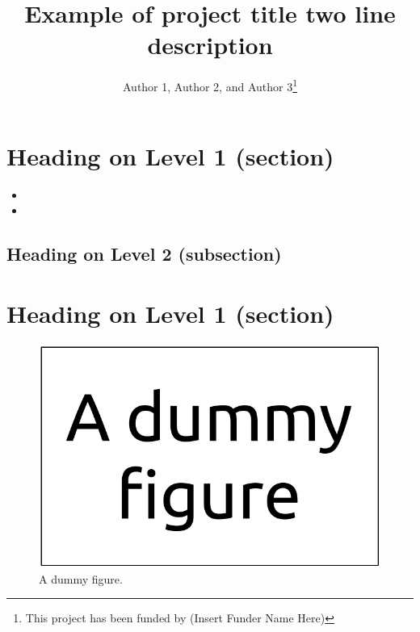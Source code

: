 \documentclass{insightposter}
\title{Example of project title two line description}
\author{Author 1, Author 2, and Author 3\thanks{This project has been funded by (Insert Funder Name Here)}}
\date{}
\begin{document}
\maketitle

\section*{Heading on Level 1 (section)}

\blindtext

\begin{itemize}
\item \blindtext
\item \blindtext
\end{itemize}

\subsection*{Heading on Level 2 (subsection)}

\blindtext

\blindtext

\section*{Heading on Level 1 (section)}

\blindtext

\blindtext

\begin{figure}
\includegraphics[width=\linewidth]{dummy-figure}
\caption{A dummy figure.}
\end{figure}

\blindtext

\blinditemize
\end{document}

